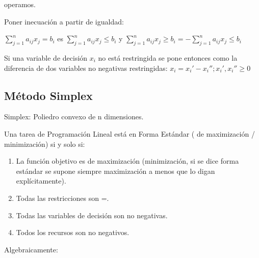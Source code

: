 \documentclass[12pt, twoside, openright]{report} %
\begin{document}
  operamos.

  
Poner inecuación a partir de igualdad:

  \(\sum_{j=1}^{n} a_{i j} x_{j} = b_{i}\) es
  \(\sum_{j=1}^{n} a_{i j} x_{j} \leqslant b_{i}\) y
  \(\sum_{j=1}^{n} a_{i j} x_{j} \geq b_{i}= -\sum_{j=1}^{n} a_{i j} x_{j} \leqslant b_{i}\)

  Si una variable de decisión \(x_i\) no está restringida se pone
  entonces como la diferencia de dos variables no negativas
  restringidas: \(x_i=x_i'-x_i''; x_i',x_i'' \geq 0\)

  
\subsection{Método Simplex}

Simplex: Poliedro convexo de n dimensiones.

    Una tarea de Programación Lineal está en Forma Estándar ( de
    maximización / minimización) si y solo si:

	
  \begin{enumerate}
  \def\labelenumi{\arabic{enumi}.}

  \item
    La función objetivo es de maximización (minimización, si se dice
    forma estándar se supone siempre maximización a menos que lo digan
    explícitamente).

    
  
    \item
      Todas las restricciones son =.
    \item
      Todas las variables de decisión son no negativas.
    \item
      Todos los recursos son no negativos.
  \end{enumerate}
\pagebreak

    Algebraicamente:
\end{document}
